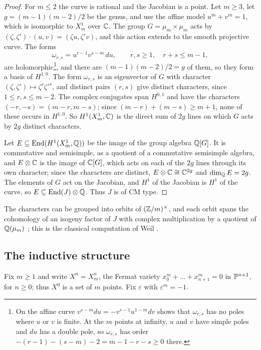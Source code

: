 \begin{proof}
For $m\le2$ the curve is rational and the Jacobian is a point. Let $m\ge3$,
let $g=(m-1)(m-2)/2$ be the genus, and use the affine model $u^{m}+v^{m}=1$,
which is isomorphic to $X^{1}_{m}$ over $\mathbb{C}$. The group $G=\mu_{m}\times
\mu_{m}$ acts by $(\zeta,\zeta')\cdot(u,v)=(\zeta u,\zeta'v)$, and this action
extends to the smooth projective curve. The forms
\[
  \omega_{r,s}=u^{r-1}v^{s-m}\,du,\qquad r,s\ge1,\quad r+s\le m-1,
\]
are holomorphic\footnote{On the affine curve $v^{s-m}du=-v^{s-1}u^{1-m}dv$
shows that $\omega_{r,s}$ has no poles where $u$ or $v$ is finite. At the
$m$ points at infinity, $u$ and $v$ have simple poles and $du$ has a double
pole, so $\omega_{r,s}$ has order $-(r-1)-(s-m)-2=m-1-r-s\ge0$ there.}, and
there are $(m-1)(m-2)/2=g$ of them, so they form a basis of $H^{1,0}$. The
form $\omega_{r,s}$ is an eigenvector of $G$ with character
$(\zeta,\zeta')\mapsto\zeta^{r}\zeta'^{s}$, and distinct pairs $(r,s)$ give
distinct characters, since $1\le r,s\le m-2$. The complex conjugates span
$H^{0,1}$ and have the characters $(-r,-s)=(m-r,m-s)$; since
$(m-r)+(m-s)\ge m+1$, none of these occurs in $H^{1,0}$. So $H^{1}(X^{1}_{m},
\mathbb{C})$ is the direct sum of $2g$ lines on which $G$ acts by $2g$ distinct
characters.

Let $E\subseteq\operatorname{End}(H^{1}(X^{1}_{m},\mathbb{Q}))$ be the image of the group algebra
$\mathbb{Q}[G]$. It is commutative and semisimple, as a quotient of a commutative
semisimple algebra, and $E\otimes\mathbb{C}$ is the image of $\mathbb{C}[G]$, which acts on
each of the $2g$ lines through its own character; since the characters are
distinct, $E\otimes\mathbb{C}\cong\mathbb{C}^{2g}$ and $\dim_{\mathbb{Q}}E=2g$. The elements of $G$
act on the Jacobian, and $H^{1}$ of the Jacobian is $H^{1}$ of the curve, so
$E\subseteq\operatorname{End}(J)\otimes\mathbb{Q}$. Thus $J$ is of CM type.
\end{proof}

The characters can be grouped into orbits of $(\mathbb{Z}/m)^{\times}$, and each
orbit spans the cohomology of an isogeny factor of $J$ with complex
multiplication by a quotient of $\mathbb{Q}(\mu_{m})$ \cite{KR78}; this is the
classical computation of Weil \cite{Wei52}.

\subsection{The inductive structure}
Fix $m\ge1$ and write $X^{n}=X^{n}_{m}$, the Fermat variety
$x_{0}^{m}+\dots+x_{n+1}^{m}=0$ in $\mathbb{P}^{n+1}$, for $n\ge0$; thus $X^{0}$ is a
set of $m$ points. Fix $\varepsilon$ with $\varepsilon^{m}=-1$.

